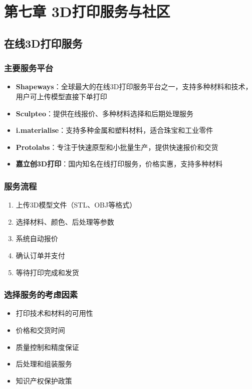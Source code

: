 \documentclass[12pt,UTF8]{ctexbook}
\begin{document}
\chapter{第七章 3D打印服务与社区}

\section{在线3D打印服务}

\subsection{主要服务平台}
\begin{itemize}
\item \textbf{Shapeways}：全球最大的在线3D打印服务平台之一，支持多种材料和技术，用户可上传模型直接下单打印
\item \textbf{Sculpteo}：提供在线报价、多种材料选择和后期处理服务
\item \textbf{i.materialise}：支持多种金属和塑料材料，适合珠宝和工业零件
\item \textbf{Protolabs}：专注于快速原型和小批量生产，提供快速报价和交货
\item \textbf{嘉立创3D打印}：国内知名在线打印服务，价格实惠，支持多种材料
\end{itemize}

\subsection{服务流程}
\begin{enumerate}
\item 上传3D模型文件（STL、OBJ等格式）
\item 选择材料、颜色、后处理等参数
\item 系统自动报价
\item 确认订单并支付
\item 等待打印完成和发货
\end{enumerate}

\subsection{选择服务的考虑因素}
\begin{itemize}
\item 打印技术和材料的可用性
\item 价格和交货时间
\item 质量控制和精度保证
\item 后处理和组装服务
\item 知识产权保护政策
\end{itemize}
\end{document}
